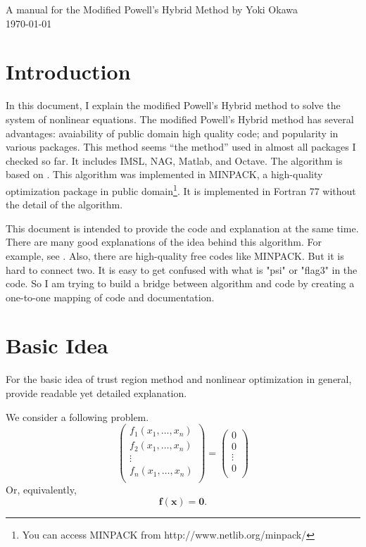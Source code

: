 \documentclass[12pt]{article}
\def\xb{{\mathbf{x}}}
\def\fb{{\mathbf{f}}}
\def\0{{\mathbf{0}}}
\newcommand{\be}{\begin{equation}}
\newcommand{\ee}{\end{equation}}
\begin{document}
\begin{center}
 {\Large A manual for the Modified Powell's Hybrid Method} {\large by Yoki Okawa }\\[0.5cm]
 {\large \today}\\[0.5cm]
\end{center}

\section{Introduction}


In this document, I explain the modified Powell's Hybrid method to solve the system of nonlinear
equations. The modified Powell's Hybrid method has several advantages: avaiability of public domain high quality code; and popularity in various packages. This method seems ``the method'' used in almost all packages I checked so far. It includes IMSL, NAG, Matlab,
and Octave. The algorithm is based on \cite{Powell1970, Powell1970a}. This
algorithm was implemented in MINPACK, a high-quality optimization package in public
domain\footnote{You can access MINPACK from http://www.netlib.org/minpack/ }. It is implemented in
Fortran 77 without the detail of the algorithm. 

This document is intended to provide the code and explanation at the same time. There are many good
explanations of the idea behind this algorithm. For example, see \cite{NocedalWright2000}. Also,
there are high-quality free codes like MINPACK. But it is hard to connect two. It is easy to get confused with what is "psi" or "flag3" in the code. So I am trying to build a
bridge between algorithm and code by creating a one-to-one mapping of code and documentation.

\section{Basic Idea}
For the basic idea of trust region method and nonlinear optimization in general,
\cite{NocedalWright2000} provide readable yet detailed explanation. 

We consider a following problem.
\[
\begin{pmatrix}
f_1(x_1,\dots,x_n)\\
f_2(x_1,\dots,x_n) \\
\vdots\\
f_n(x_1,\dots,x_n) \\
\end{pmatrix}
= 
\begin{pmatrix}
0\\
0 \\
\vdots\\
0\\
\end{pmatrix}
\]
Or, equivalently,
\be \label{eq:prob}
\fb (\xb) = \0.
\ee
\end{document}
